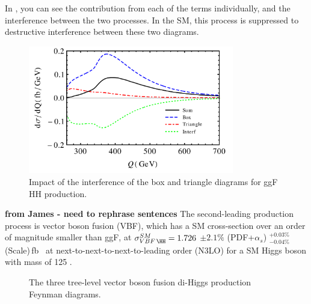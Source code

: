 In \Fig{\ref{fig:box_tri}}, you can see the contribution from each of the terms individually, and the interference between the two processes.
In the SM, this process is suppressed to destructive interference between these two diagrams.


\begin{figure}[h]
    \centering
    \includegraphics[width=0.8\textwidth]{figures/my_dihiggs/box_triangle_diagram.pdf}
    \caption{Impact of the interference of the box and triangle diagrams for ggF HH production.}
    \label{fig:box-tri}
\end{figure}




\textbf{from James - need to rephrase sentences}
The second-leading \HH production process is vector boson fusion (VBF), which has a SM cross-section over an order of magnitude smaller than ggF, at $\sigma_{VBF\,\HH}^{SM} = 1.726$ $\pm 2.1\%$ (PDF+$\alpha_{s}$) $^{+0.03\%}_{-0.04\%}$(Scale)\,fb~\cite{Dreyer_2018} at next-to-next-to-next-to-leading order (N3LO) for a SM Higgs boson with mass of 125 \GeV. 


\begin{figure}[t]
    \centering
    \caption{The three tree-level vector boson fusion di-Higgs production Feynman diagrams.}
    \label{fig:VBF_feyn_dias}
\end{figure}

